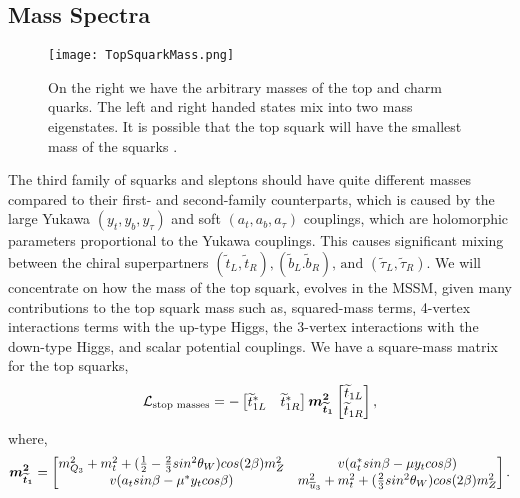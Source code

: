 \subsection{Mass Spectra}\label{subsec:StopMassSpec}

\begin{figure}
\centering
	\texttt{[image: TopSquarkMass.png]}
 	\caption[Top squark mass hierarchy]{On the right we have the arbitrary masses of the top and charm quarks. The left and right handed states mix into two mass eigenstates. It is possible that the top squark will have the smallest mass of the squarks \cite{martin_supersymmetry_1997}.}
 	\label{StopMass} 
\end{figure}

The third family of squarks and sleptons should have quite different masses compared to their first- and second-family counterparts, which is caused by the large Yukawa $(y_t, y_b, y_\tau)$ and soft $(a_t, a_b, a_\tau)$ couplings, which are holomorphic parameters proportional to the Yukawa couplings. This causes significant mixing between the chiral superpartners $(\widetilde{t}_L, \widetilde{t}_R), (\widetilde{b}_L. \widetilde{b}_R)\text{, and } (\widetilde{\tau}_L, \widetilde{\tau}_R)$. We will concentrate on how the mass of the top squark, \st{} evolves in the MSSM, given many contributions to the top squark mass such as, squared-mass terms, 4-vertex interactions terms with the up-type Higgs, the 3-vertex interactions with the down-type Higgs, and scalar potential couplings. We have a square-mass matrix for the top squarks, 
\begin{equation}
\mathcal{L}_{\text{stop masses}}=-
\begin{bmatrix}
\widetilde{t}_{1L}^* & \widetilde{t}_{1R}^* \\
\end{bmatrix}
\boldsymbol{m_{\widetilde{t}_1}^2}
\begin{bmatrix}
\widetilde{t}_{1L} \\
\widetilde{t}_{1R} \\
\end{bmatrix},
\end{equation}
where, 
\begin{equation}
\boldsymbol{m_{\widetilde{t}_1}^2}=
\begin{bmatrix}
m_{Q_3}^2+m_t^2+(\frac{1}{2}-\frac{2}{3}sin^2\theta_W)cos(2\beta)m_Z^2 & v(a_t^*sin\beta-\mu y_tcos\beta) \\
v(a_tsin\beta-\mu^*y_tcos\beta) & m^2_{\overline{u}_3} +m_t^2+(\frac{2}{3}sin^2\theta_W)cos(2\beta)m^2_Z \\ 
\end{bmatrix}.
\end{equation}


